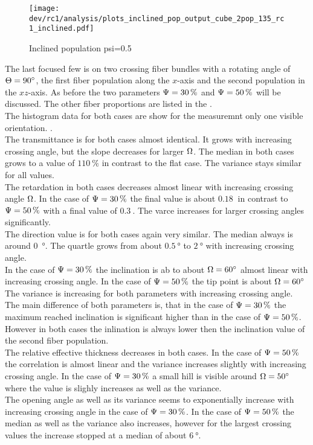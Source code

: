 % 
\begin{figure}[!p]
\centering
\texttt{[image: dev/rc1/analysis/plots\_inclined\_pop\_output\_cube\_2pop\_135\_rc1\_inclined.pdf]}
\caption[]{Inclined population psi=0.5}
\label{fig:incl_05_fiber_pop_rofl}
\end{figure}
% 
% 
The last focused few is on two crossing fiber bundles with a rotating angle of $\textnormal{$\Theta$} = \SI{90}{\degree}$, \ie{} the first fiber population along the $x$-axis and the second population in the $xz$-axis.
As before the two parameters $\textnormal{$\Psi$} = \SI{30}{\percent}$ and $\textnormal{$\Psi$} = \SI{50}{\percent}$  will be discussed.
The other fiber proportions are listed in the \dummy[appendix]{}.
\\
% 
The histogram data for both cases are show for the measuremnt only one visible orientation.
\dummy{}.
\\
The transmittance is for both cases almost identical.
It grows with increasing crossing angle, but the slope decreases for larger $\textnormal{$\Omega$}$.
The median in both cases grows to a value of $\SI{110}{\percent}$ in contrast to the flat case.
The variance stays similar for all values.
\\
The retardation in both cases decreases almost linear with increasing crossing angle $\textnormal{$\Omega$}$.
In the case of $\textnormal{$\Psi$} = \SI{30}{\percent}$ the final value is about $\SI{0.18}{}$ in contrast to $\textnormal{$\Psi$} = \SI{50}{\percent}$ with a final value of $\SI{0.3}{}$.
The varce increases for larger crossing angles significantly.
\\
The direction value is for both cases again very similar.
The median always is around \SI{0}{\degree}.
The quartle grows from about $\SI{0.5}{\degree}$ to $\SI{2}{\degree}$ with increasing crossing angle.
\\
In the case of $\textnormal{$\Psi$} = \SI{30}{\percent}$ the inclination is ab to about $\textnormal{$\Omega$} =\SI{60}{\degree}$ almost linear with increasing crossing angle.
In the case of $\textnormal{$\Psi$} = \SI{50}{\percent}$ the tip point is about $\textnormal{$\Omega$} = \SI{60}{\degree}$
The variance is increasing for both parameters with increasing crossing angle.
The main difference of both parameters is, that in the case of $\textnormal{$\Psi$} = \SI{30}{\percent}$ the maximum reached inclination is significant higher than in the case of $\textnormal{$\Psi$} = \SI{50}{\percent}$.
However in both cases the inlination is always lower then the inclination value of the second fiber population.
\\
The relative effective thickness \trel{} decreases in both cases.
In the case of $\textnormal{$\Psi$} = \SI{50}{\percent}$ the correlation is almost linear and the variance increases slightly with increasing crossing angle.
In the case of $\textnormal{$\Psi$} = \SI{30}{\percent}$ a small hill is visible around $\textnormal{$\Omega$} = \SI{50}{\degree}$ where the value is slighly increases as well as the variance.
\\
The opening angle as well as its variance seems to exponentially increase with increasing crossing angle in the case of $\textnormal{$\Psi$} = \SI{30}{\percent}$.
In the case of $\textnormal{$\Psi$} = \SI{50}{\percent}$ the median as well as the variance also increases, however for the largest crossing values the increase stopped at a median of about $\SI{6}{\degree}$.
% 
% 
